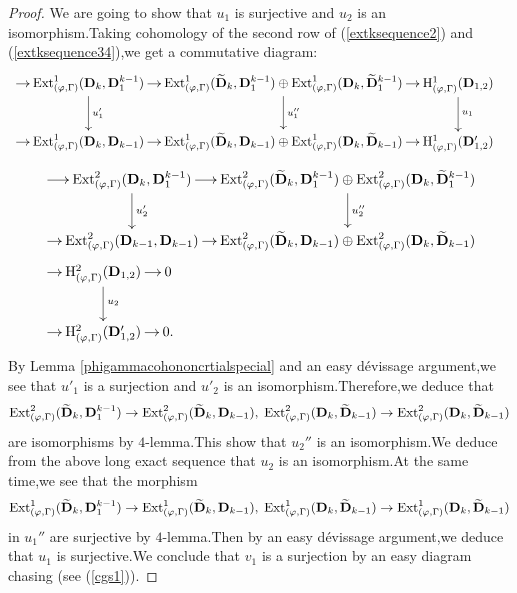 \documentclass[SecEq,CM,GP]{degruyter-crelle} %
\theoremstyle{plain}
\newcommand{\Dpik}{{\mathbf{D}}}
\newcommand{\ext}{{\rm Ext}}
\newcommand{\hH}{{\mathrm{H}}}
\begin{document}
\begin{proof}
We are going to show that 
$u_1$ is surjective and $u_2$ is an isomorphism.\;Taking cohomology of the second row of (\ref{extksequence2}) and (\ref{extksequence34}),\;we get a commutative diagram:
\begin{equation}
	\begin{aligned}
		& \xymatrix@C=2.2ex{ \ar[r] & \ext^1_{(\varphi,\Gamma)}(\Dpik_{k},\Dpik_1^{k-1}) \ar[d]^{u_1'}  \ar[r] & \ext^1_{(\varphi,\Gamma)}(\widetilde{\Dpik}_{k},{\Dpik}_1^{k-1})\oplus \ext^1_{(\varphi,\Gamma)}(\Dpik_{k},\widetilde\Dpik_{1}^{k-1}) \ar[d]^{u_1''}  \ar[r]   & \hH^1_{(\varphi,\Gamma)}(\Dpik_{1,2}) \ar[d]^{u_1}\\
			\ar[r] & \ext^1_{(\varphi,\Gamma)}(\Dpik_{k},\Dpik_{k-1})  \ar[r] & \ext^1_{(\varphi,\Gamma)}(\widetilde{\Dpik}_{k},{\Dpik}_{k-1})\oplus \ext^1_{(\varphi,\Gamma)}(\Dpik_{k},\widetilde\Dpik_{k-1})   \ar[r]   & \hH^1_{(\varphi,\Gamma)}(\Dpik_{1,2}')
	}\end{aligned}
\end{equation}
\begin{equation}
	\begin{aligned}
		& \xymatrix@C=2.2ex{ \ar[r] & \ext^2_{(\varphi,\Gamma)}(\Dpik_{k},\Dpik_1^{k-1}) \ar[d]^{u_2'}  \ar[r] & \ext^2_{(\varphi,\Gamma)}(\widetilde{\Dpik}_{k},{\Dpik}_1^{k-1})\oplus \ext^2_{(\varphi,\Gamma)}(\Dpik_{k},\widetilde\Dpik_{1}^{k-1}) \ar[d]^{u_2''}  \\
			\ar[r] & \ext^2_{(\varphi,\Gamma)}(\Dpik_{k-1},\Dpik_{k-1})   \ar[r] & \ext^2_{(\varphi,\Gamma)}(\widetilde{\Dpik}_{k},{\Dpik}_{k-1})\oplus \ext^2_{(\varphi,\Gamma)}(\Dpik_{k},\widetilde\Dpik_{k-1})   
		}\\
		& \xymatrix@C=2.2ex{   \ar[r]  & \hH^2_{(\varphi,\Gamma)}(\Dpik_{1,2}) \ar[d]^{u_2}  \ar[r] & 0\\
			\ar[r]   & \hH^2_{(\varphi,\Gamma)}(\Dpik_{1,2}') \ar[r] & 0
			.}
	\end{aligned}
\end{equation}
By Lemma \ref{phigammacohononcrtialspecial} and an easy d\'{e}vissage argument,\;we see that $u'_1$ is a surjection and $u'_2$ is an isomorphism.\;Therefore,\;we deduce that  \[\ext^2_{(\varphi,\Gamma)}(\widetilde{\Dpik}_{k},{\Dpik}_1^{k-1}) \rightarrow \ext^2_{(\varphi,\Gamma)}(\widetilde{\Dpik}_{k},{\Dpik}_{k-1}),\; \ext^2_{(\varphi,\Gamma)}(\Dpik_{k},\widetilde\Dpik_{k-1}) \rightarrow \ext^2_{(\varphi,\Gamma)}(\Dpik_{k},\widetilde\Dpik_{k-1})\] are isomorphisms by $4$-lemma.\;This show that $u_2''$ is an isomorphism.\;We deduce from the above long exact sequence that $u_2$ is an isomorphism.\;At the same time,\;we see that the morphism \[\ext^1_{(\varphi,\Gamma)}(\widetilde{\Dpik}_{k},{\Dpik}_1^{k-1}) \rightarrow \ext^1_{(\varphi,\Gamma)}(\widetilde{\Dpik}_{k},{\Dpik}_{k-1}),\;\ext^1_{(\varphi,\Gamma)}(\Dpik_{k},\widetilde\Dpik_{k-1}) \rightarrow \ext^1_{(\varphi,\Gamma)}(\Dpik_{k},\widetilde\Dpik_{k-1})\] in $u_1''$ are surjective by $4$-lemma.\;Then by an  easy d\'{e}vissage argument,\;we deduce that  $u_1$ is surjective.\;We conclude that $v_1$ is a surjection by an easy diagram chasing (see (\ref{cgs1})).\;


\end{proof}
\end{document}
